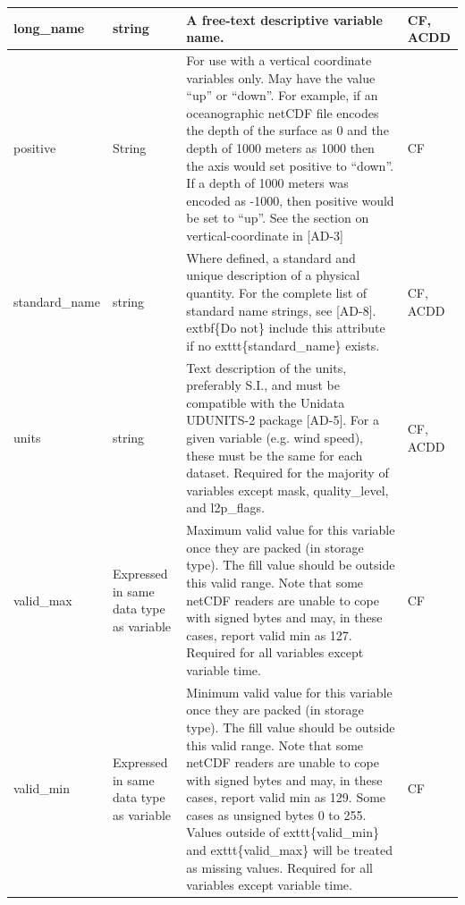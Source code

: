 \begin{longtable}{|p{}|p{}|p{}|p{}|}
\rowcolor{violet!25} 
long\_name & string & A free-text descriptive variable name. & CF, ACDD \\ \hline

\rowcolor{violet!25} 
positive & String & For use with a vertical coordinate variables only. May have the value “up” or “down”. For example, if an oceanographic netCDF file encodes the depth of the surface as 0 and the depth of 1000 meters as 1000 then the axis would set positive to “down”. If a depth of 1000 meters was encoded as -1000, then positive would be set to “up”. See the section on vertical-coordinate in [AD-3] & CF \\ \hline

\rowcolor{violet!25} 
standard\_name & string & Where defined, a standard and unique description of a physical quantity. For the complete list of standard name strings, see [AD-8]. \hspace{0.5cm}extbf\{Do not\} include this attribute if no \hspace{0.5cm}exttt\{standard\_name\} exists. & CF, ACDD \\ \hline

\rowcolor{violet!25} 
units & string & Text description of the units, preferably S.I., and must be compatible with the Unidata UDUNITS-2 package [AD-5]. For a given variable (e.g. wind speed), these must be the same for each dataset. Required for the majority of variables except mask, quality\_level, and l2p\_flags. & CF, ACDD \\ \hline

\rowcolor{violet!25} 
valid\_max & Expressed in same data type as variable & Maximum valid value for this variable once they are packed (in storage type). The fill value should be outside this valid range. Note that some netCDF readers are unable to cope with signed bytes and may, in these cases, report valid min as 127. Required for all variables except variable time. & CF \\ \hline

\rowcolor{violet!25} 
valid\_min & Expressed in same data type as variable & Minimum valid value for this variable once they are packed (in storage type). The fill value should be outside this valid range. Note that some netCDF readers are unable to cope with signed bytes and may, in these cases, report valid min as 129. Some cases as unsigned bytes 0 to 255. Values outside of \hspace{0.5cm}exttt\{valid\_min\} and \hspace{0.5cm}exttt\{valid\_max\} will be treated as missing values. Required for all variables except variable time. & CF \\ \hline

\end{longtable}
